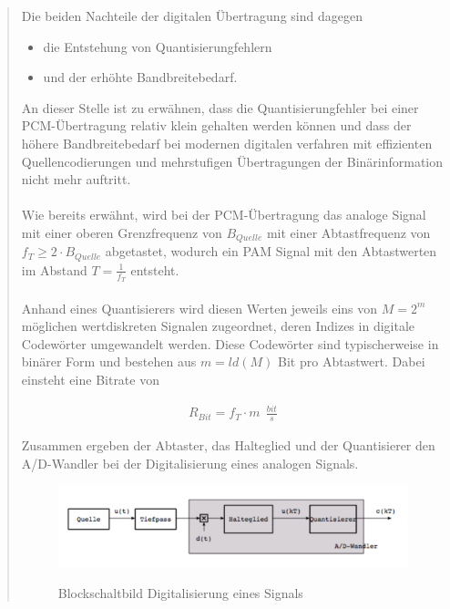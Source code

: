 \begin{quote}
	\vspace{1em}
	
	Die beiden Nachteile der digitalen Übertragung sind dagegen
	\begin{itemize}
		\item die Entstehung von Quantisierungfehlern
		\item und der erhöhte Bandbreitebedarf.
	\end{itemize}
	
	\vspace{0.5em}
	
	An dieser Stelle ist zu erwähnen, dass die Quantisierungfehler bei einer
	PCM-Übertragung relativ klein gehalten werden können und dass der höhere
	Bandbreitebedarf bei modernen digitalen verfahren mit effizienten
	Quellencodierungen und mehrstufigen Übertragungen der Binärinformation nicht
	mehr auftritt.\\
	
	 \\
	Wie bereits erwähnt, wird bei der PCM-Übertragung das analoge Signal mit einer
	oberen Grenzfrequenz von $B_{Quelle}$ mit einer Abtastfrequenz von $f_T \geq 2
	\cdot B_{Quelle}$ abgetastet, wodurch ein PAM Signal mit den Abtastwerten im
	Abstand $T = \frac{1}{f_T}$ entsteht.\\
	 \\
	Anhand eines Quantisierers wird diesen Werten jeweils eins von $M = 2^m$ möglichen wertdiskreten Signalen zugeordnet,
	deren Indizes in digitale Codewörter umgewandelt werden. Diese Codewörter sind
	typischerweise in binärer Form und bestehen aus $m = ld(M)$ Bit pro Abtastwert.
	Dabei einsteht eine Bitrate von
	
       \begin{equation*}
        	\begin{split}
        		R_{Bit} = f_T \cdot m \ \ \frac{bit}{s}
        	\end{split}
        \end{equation*}        
    
	\vspace{0.5em}
	   
	Zusammen ergeben der Abtaster, das Halteglied und der Quantisierer den
	A/D-Wandler bei der Digitalisierung eines analogen Signals.\\
	
	\begin{figure}[H]
    \centering
        \includegraphics[scale=0.7, trim = 0cm 0cm 0cm 0cm, clip]{./Bilder/Digitalisierung_des_Signals}
            \caption{Blockschaltbild Digitalisierung eines Signals}
            \cite{Digitalisierung_des_Signals}
    \end{figure}
    

\end{quote}
